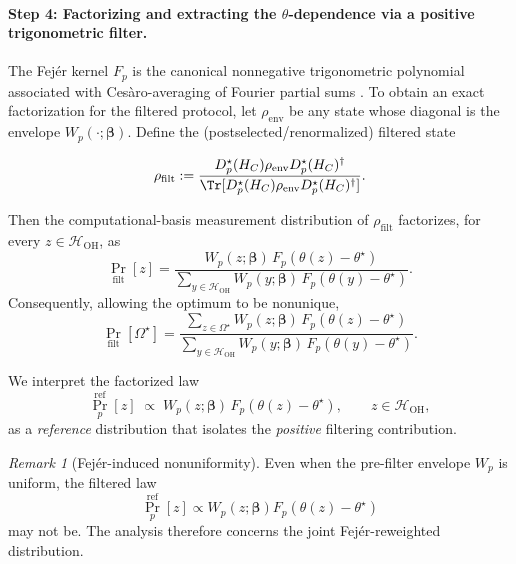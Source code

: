 \documentclass[a4paper,unpublished,onecolumn,11pt]{quantumarticle}
\theoremstyle{definition}
\theoremstyle{remark}
\newtheorem{remark}[theorem]{Remark}
\newcommand{\OH}{\mathcal{H}_{\mathrm{OH}}}
\begin{document}
\paragraph{Step 4: Factorizing and extracting the \(\theta\)-dependence via a positive trigonometric filter.}
The Fej\'er kernel \(F_p\) is the canonical nonnegative trigonometric polynomial
associated with Ces\`aro-averaging of Fourier partial sums \cite{SteinShakarchi2003Fourier,Katznelson2004}. To obtain an exact factorization for the filtered protocol, let $\rho_{\mathrm{env}}$ be any state whose diagonal is the envelope $W_p(\cdot;\boldsymbol\beta)$.
Define the (postselected/renormalized) filtered state

\begin{equation}
\rho_{\mathrm{filt}}
:=
\frac{
D_p^\star(H_C)\rho_{\mathrm{env}}D_p^\star(H_C)^\dagger
}{
\Tr[
D_p^\star(H_C)\rho_{\mathrm{env}}D_p^\star(H_C)^\dagger
]
}.
\end{equation}

Then the computational-basis measurement distribution of
$\rho_{\mathrm{filt}}$ factorizes, for every $z\in\OH$, as
\begin{equation}
\Pr_{\mathrm{filt}}[z]
=
\frac{
W_p(z;\boldsymbol\beta)\,
F_p(\theta(z)-\theta^\star)
}{
\sum_{y\in\OH}
W_p(y;\boldsymbol\beta)\,
F_p(\theta(y)-\theta^\star)
}.
\end{equation}
Consequently, allowing the optimum to be nonunique,
\begin{equation}
\Pr_{\mathrm{filt}}[\Omega^\star]
=
\frac{
\displaystyle
\sum_{z\in\Omega^\star}
W_p(z;\boldsymbol\beta)\,
F_p(\theta(z)-\theta^\star)
}{
\displaystyle
\sum_{y\in\OH}
W_p(y;\boldsymbol\beta)\,
F_p(\theta(y)-\theta^\star)
}.
\end{equation}


We interpret the factorized law
\begin{equation}
\label{eq:factorize}
\Pr^{\mathrm{ref}}_p[z]
\;\propto\;
W_p(z;\boldsymbol\beta)\,
F_p(\theta(z)-\theta^\star),
\qquad z\in\OH,
\end{equation}
as a \emph{reference} distribution that isolates the
\emph{positive} filtering contribution.

\begin{remark}[Fej\'er-induced nonuniformity]
Even when the pre-filter envelope \(W_p\) is uniform, the filtered law
\[
\Pr_p^{\mathrm{ref}}[z]
\propto
W_p(z;\boldsymbol\beta)F_p(\theta(z)-\theta^\star)
\]
may not be. The analysis therefore concerns the
joint Fej\'er-reweighted distribution.
\end{remark}
\end{document}
